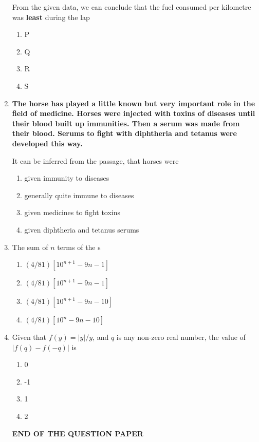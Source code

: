 \documentclass[journal]{IEEEtran}
\numberwithin{equation}{enumi}
\numberwithin{figure}{enumi}
\begin{document}
\begin{enumerate}
From the given data, we can conclude that the fuel consumed per kilometre was \textbf{least} during the lap 

\begin{multicols}{4}
\begin{enumerate}
   \item P
   \item Q
   \item R
    \item S
\end{enumerate}
\end{multicols}


\item \textbf{The horse has played a little known but very important role in the field of medicine. Horses were injected with toxins of diseases until their blood built up immunities. Then a serum was made from their blood. Serums to fight with diphtheria and tetanus were developed this way.}

It can be inferred from the passage, that horses were
\hfill{}

\begin{enumerate}
    
    \item given immunity to diseases
    \item generally quite immune to diseases
    \item given medicines to fight toxins
    \item given diphtheria and tetanus serums
\end{enumerate}



\item  The sum of $n$ terms of the s
\hfill{}
\begin{enumerate}
    \item $(4/81) [10^{n+1} - 9n - 1]$
    \item $(4/81) [10^{n+1} - 9n - 1]$
    \item $(4/81) [10^{n+1} - 9n - 10]$
    \item $(4/81) [10^{n} - 9n - 10]$
\end{enumerate}

\item  Given that $f(y) = |y| / y$, and $q$ is any non-zero real number, the value of  \\$\left| f(q) - f(-q) \right|$ is
\hfill{}

\begin{multicols}{4}
\begin{enumerate}
   \item 0
   \item -1
   \item 1
    \item 2
\end{enumerate}
\end{multicols}

 

\begin{center}
    \textbf{END OF THE QUESTION PAPER}
\end{center}



\end{enumerate}
\end{document}
